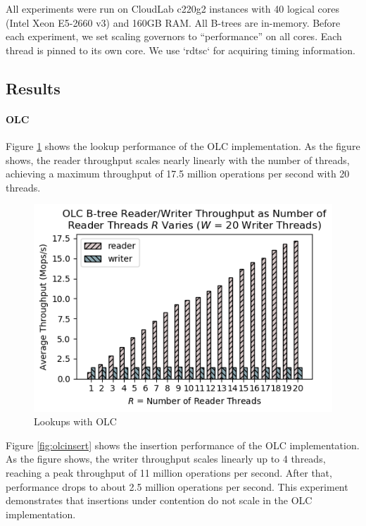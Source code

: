 \documentclass[twocolumn]{article}
\begin{document}
All experiments were run on CloudLab c220g2 instances with 40 logical cores
(Intel Xeon E5-2660 v3) and 160GB RAM. All B-trees are in-memory. Before each
experiment, we set scaling governors to “performance” on all cores. Each thread
is pinned to its own core. We use `rdtsc` for acquiring timing information.

\subsection{Results}

\paragraph{OLC}

Figure \ref{fig:olclookup} shows the lookup performance of the OLC
implementation. As the figure shows, the reader throughput scales nearly
linearly with the number of threads, achieving a maximum throughput of 17.5
million operations per second with 20 threads.

\begin{figure}[ht]
    \centering \includegraphics[width=\columnwidth]{figures/olc_w20_r1-20_avg.png}
    \caption{Lookups with OLC \label{fig:olclookup}}
\end{figure}

Figure \ref{fig:olcinsert} shows the insertion performance of the OLC
implementation. As the figure shows, the writer throughput scales linearly up
to 4 threads, reaching a peak throughput of 11 million operations per second.
After that, performance drops to about 2.5 million operations per second. This
experiment demonstrates that insertions under contention do not scale in the
OLC implementation.
\end{document}
